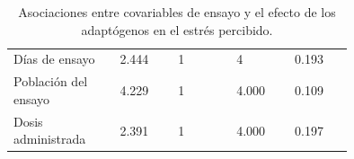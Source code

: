 \begin{table}[H]

\caption{Asociaciones entre covariables de ensayo y el efecto de los adaptógenos en el estrés percibido.}
\label{tab:covariables_adaptógenos_PSS}

\begin{threeparttable}

{\small{}

\begin{tabular}{M{0.2\linewidth}M{0.1375\linewidth}M{0.1375\linewidth}M{0.1375\linewidth}M{0.1375\linewidth}}\hline
    
    \theader{} &  &  &  &  \\ \hline

    Días de ensayo & 2.444 & 1 & 4 & 0.193 \\
    Población del ensayo & 4.229 & 1 & 4.000 & 0.109 \\
    Dosis administrada & 2.391 & 1 & 4.000 & 0.197 \\

    \hline
\end{tabular}

}

\begin{tablenotes}\tiny %
    \item[] 
\end{tablenotes}

\end{threeparttable}
\end{table}